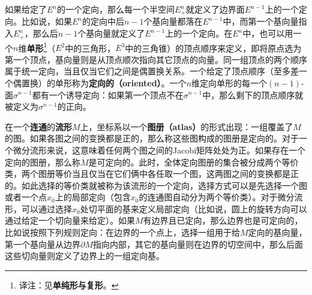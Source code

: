 如果给定了$E^n$的一个定向，那么每一个半空间$E^n_+$就定义了边界面$E^{n-1}$上的一个定向。比如说，如果$E^n$的定向中后$n-1$个基向量都落在$E^{n-1}$中，而第一个基向量指入$E^n_+$，那么后$n-1$个基向量就定义了$E^{n-1}$上的一个定向。在$E^n$中，也可以用一个$n$维\textbf{单形}\footnote{译注：见\textbf{单纯形与复形}。}（$E^2$中的三角形，$E^3$中的三角锥）的顶点顺序来定义，即将原点选为第一个顶点，基向量则是从顶点顺次指向其它顶点的向量。同一组顶点的两个顺序属于统一定向，当且仅当它们之间是偶置换关系。一个给定了顶点顺序（至多差一个偶置换）的单形称为\textbf{定向的（oriented）}。一个$n$维定向单形的每一个$(n-1)$-面$\sigma^{n-1}$都有一个诱导定向：如果第一个顶点不在$\sigma^{n-1}$中，那么剩下的顶点顺序就被定义为$\sigma^{n-1}$的正向。




在一个\textbf{连通}的\textbf{流形}$M$上，坐标系以一个\textbf{图册（atlas）}的形式出现：一组覆盖了$M$的图。如果各图之间的变换都是正的，那么称这些图构成的图册是定向的。对于一个微分流形来说，这意味着任何两个图之间的Jacobi矩阵处处为正。如果存在一个定向的图册，那么称$M$是可定向的。此时，全体定向图册的集合被分成两个等价类，两个图册等价当且仅当在它们俩中各任取一个图，这两图之间的变换都是正的。如此选择的等价类就被称为该流形的一个定向，选择方式可以是先选择一个图或者一个点$x_0$上的局部定向（包含$x_0$的连通图自动分为两个等价类）。对于微分流形，可以通过选择$x_0$处切平面的基来定义局部定向（比如说，圆上的旋转方向可以通过给定一个切向量来给定）。如果$M$有边界且已定向，那么边界也是可定向的，比如说按照下列规则定向：在边界的一个点上，选择一组用于给$M$定向的基向量，第一个基向量从边界$\partial M$指向内部，其它的基向量则在边界的切空间中，那么后面这些切向量则定义了边界上的一组定向基。


